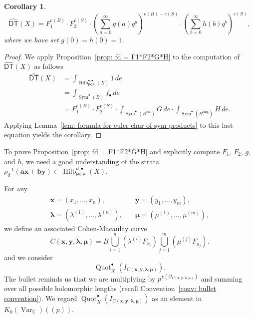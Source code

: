\documentclass[12pt]{amsart}
\newtheorem{corollary}[theorem]{Corollary}
\theoremstyle{definition}
\newcommand{\CC} {\mathbb{C}}          %
\renewcommand{\O}{\mathcal{O}}
\newcommand{\Sym}{\operatorname{Sym}}
\newcommand{\Hilb}{\operatorname{Hilb}}
\newcommand{\Quot}{\operatorname{Quot}}
\newcommand{\DT}{\mathsf{DT}}
\newcommand{\Var}{\operatorname{Var}}
\newcommand{\sm}{\operatorname{sm}}
\newcommand{\sing}{\operatorname{sing}}
\newcommand{\boldx}{\boldsymbol{x}}
\newcommand{\boldy}{\boldsymbol{y}}
\newcommand{\bolda}{\boldsymbol{a}}
\newcommand{\boldb}{\boldsymbol{b}}
\newcommand{\boldlambda}{\boldsymbol{\lambda }}
\newcommand{\boldmu}{\boldsymbol{\mu }}
\newcommand{\DThat}{\widehat{\DT}}
\newcommand{\PCP}{\mathsf{PCP}}
\begin{document}
\begin{corollary}\label{cor: DThat = F1^{e(B)}F2^{e(S)}(sum g q^{a})^{e(B)-e(S)}...}
\[
\DThat (X) = F_{1}^{e(B)}\cdot F_{2}^{e(S)}\cdot
\left(\sum_{a=0}^{\infty}g(a) q^{a} \right)^{e(B)-e(S)}\cdot
\left(\sum_{b=0}^{\infty}h(b) q^{b} \right)^{e(S)},
\]
where we have set $g(0)=h(0)=1$.
\end{corollary}
\begin{proof}
We apply Proposition~\ref{prop: fd = F1*F2*G*H} to the computation of
$\DThat (X)$ as follows
\begin{align*}
\DThat (X)&= \int_{\Hilb^{\bullet ,\bullet}_{\PCP}(X)} 1\, de\\
&=\int_{\Sym^{\bullet}(B)}f_{\bullet } \, de \\
&= F_{1}^{e(B)}\cdot F_{2}^{e(S)}\cdot  \int_{\Sym^{\bullet}(B^{\sm})}
G\,de \cdot  \int_{\Sym^{\bullet}(B^{\sing})}
H\,de .
\end{align*}
Applying Lemma~\ref{lem: formula for euler char of sym products} to
this last equation yields the corollary. 
\end{proof}


To prove Proposition~\ref{prop: fd = F1*F2*G*H} and explicitly
compute $F_{1}$, $F_{2}$, $g$, and $h$, we need a good understanding
of the strata $\rho_{d}^{-1} (\bolda \boldx +\boldb \boldy )\subset
\Hilb^{d,\bullet}_{\PCP}(X)$.

For any
\begin{align*}
\boldx =(x_{1},\dotsc ,x_{n}),&\quad \boldy =(y_{1},\dotsc
,y_{m}),\\
\boldlambda =(\lambda^{(1)},\dotsc ,\lambda^{(n)}),&\quad \boldmu =(\mu^{(1)},\dotsc ,\mu^{(m)}),
\end{align*}
we define an associated Cohen-Macaulay curve
\[
C(\boldx, \boldy, \boldlambda, \boldmu) = B \bigcup_{i=1}^{n}\left(\lambda^{(i)}F_{x_{i}} \right)
\bigcup_{j=1}^{m}\left(\mu^{(j)}F_{y_{j}} \right).
\]
 and we consider
 \[
\Quot_X^{\bullet}(I_{C(\boldx, \boldy, \boldlambda, \boldmu)}).
 \]
The bullet reminds us that we are multiplying by 
$p^{\chi (\O_{C(\boldx, \boldy, \boldlambda, \boldmu)})}$
and summing over all possible holomorphic lengths
(recall Convention~\ref{conv: bullet convention}). We regard
$\Quot_X^{\bullet}(I_{C(\boldx, \boldy, \boldlambda, \boldmu)})$ 
as an element in $K_{0}(\Var_{\CC})(\!(p)\!)$. 
\end{document}
